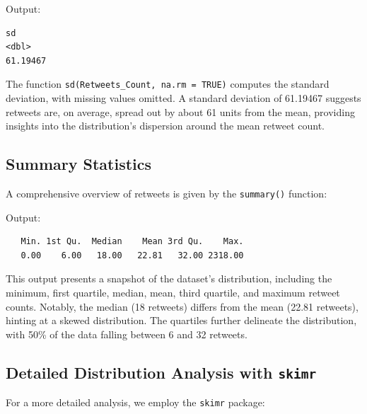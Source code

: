 \documentclass[
]{book}
\newenvironment{Shaded}{\begin{snugshade}}{\end{snugshade}}
\newcommand{\FunctionTok}[1]{\textcolor[rgb]{0.13,0.29,0.53}{\textbf{#1}}}
\newcommand{\NormalTok}[1]{#1}
\newcommand{\SpecialCharTok}[1]{\textcolor[rgb]{0.81,0.36,0.00}{\textbf{#1}}}
\begin{document}
Output:

\begin{verbatim}
sd
<dbl>
61.19467
\end{verbatim}

The function \texttt{sd(Retweets\_Count,\ na.rm\ =\ TRUE)} computes the standard deviation, with missing values omitted. A standard deviation of 61.19467 suggests retweets are, on average, spread out by about 61 units from the mean, providing insights into the distribution's dispersion around the mean retweet count.

\hypertarget{summary-statistics}{%
\subsection{Summary Statistics}\label{summary-statistics}}

A comprehensive overview of retweets is given by the \texttt{summary()} function:

\begin{Shaded}
\end{Shaded}

Output:

\begin{verbatim}
   Min. 1st Qu.  Median    Mean 3rd Qu.    Max. 
   0.00    6.00   18.00   22.81   32.00 2318.00 
\end{verbatim}

This output presents a snapshot of the dataset's distribution, including the minimum, first quartile, median, mean, third quartile, and maximum retweet counts. Notably, the median (18 retweets) differs from the mean (22.81 retweets), hinting at a skewed distribution. The quartiles further delineate the distribution, with 50\% of the data falling between 6 and 32 retweets.

\hypertarget{detailed-distribution-analysis-with-skimr}{%
\subsection{\texorpdfstring{Detailed Distribution Analysis with \texttt{skimr}}{Detailed Distribution Analysis with skimr}}\label{detailed-distribution-analysis-with-skimr}}

For a more detailed analysis, we employ the \texttt{skimr} package:
\end{document}
